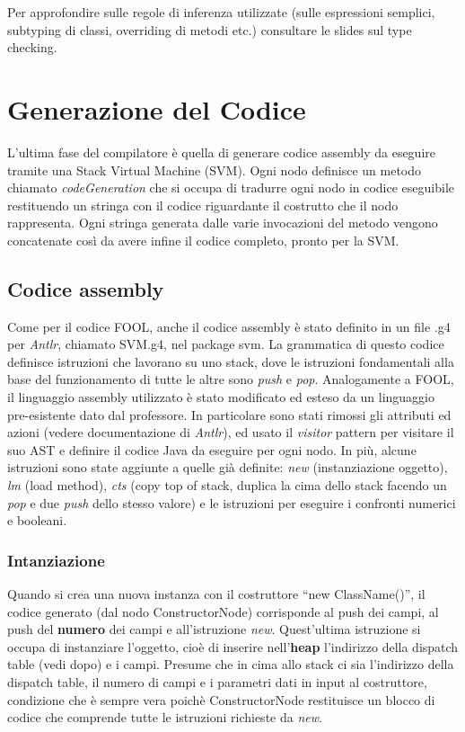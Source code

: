 \documentclass{scrreprt}
\begin{document}
Per approfondire sulle regole di inferenza utilizzate (sulle espressioni semplici, subtyping di classi, overriding di metodi etc.) consultare le slides sul type checking.

\chapter{Generazione del Codice}

L'ultima fase del compilatore è quella di generare codice assembly da eseguire tramite una Stack Virtual Machine (SVM).
Ogni nodo definisce un metodo chiamato \textit{codeGeneration} che si occupa di tradurre ogni nodo in codice eseguibile restituendo un stringa con il codice
riguardante il costrutto che il nodo rappresenta. Ogni stringa generata dalle varie invocazioni del metodo vengono concatenate così da avere infine il codice completo, 
pronto per la SVM. 

\section{Codice assembly}
Come per il codice FOOL, anche il codice assembly è stato definito in un file .g4 per \textit{Antlr}, chiamato SVM.g4, nel package svm. La grammatica di questo codice
definisce istruzioni che lavorano su uno stack, dove le istruzioni fondamentali alla base del funzionamento di tutte le altre sono \textit{push} e \textit{pop}. Analogamente a FOOL, 
il linguaggio assembly utilizzato è stato modificato ed esteso da un linguaggio pre-esistente dato dal professore. In particolare sono stati rimossi gli attributi ed azioni (vedere documentazione di \textit{Antlr}),
ed usato il \textit{visitor} pattern per visitare il suo AST e definire il codice Java da eseguire per ogni nodo. In più, alcune istruzioni sono state aggiunte a quelle già definite: \textit{new} (instanziazione oggetto), \textit{lm} (load method), \textit{cts} (copy top of stack, duplica la cima dello stack facendo un \textit{pop} e due \textit{push} dello stesso valore) e le istruzioni per eseguire
i confronti numerici e booleani.

\subsection{Intanziazione}

Quando si crea una nuova instanza con il costruttore ``new ClassName()'', il codice generato (dal nodo ConstructorNode) corrisponde al push dei campi, al push del \textbf{numero} dei campi e all'istruzione \textit{new}. Quest'ultima 
istruzione si occupa di instanziare l'oggetto, cioè di inserire nell'\textbf{heap} l'indirizzo della dispatch table (vedi dopo) e i campi. Presume che in cima allo stack ci sia l'indirizzo della dispatch table, 
il numero di campi e i parametri dati in input al costruttore, condizione che è sempre vera poichè ConstructorNode restituisce un blocco di codice che comprende tutte le istruzioni richieste da \textit{new}.
\end{document}
